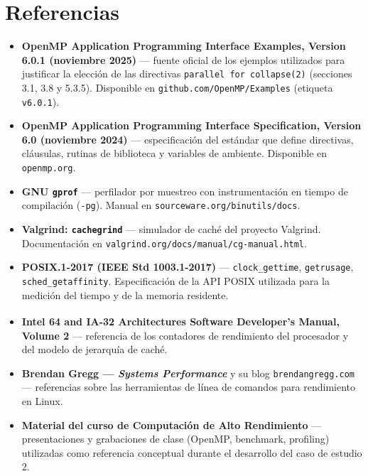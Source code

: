 \section{Referencias}

\begin{itemize}
    \item \textbf{OpenMP Application Programming Interface Examples, Version 6.0.1 (noviembre 2025)} --- fuente oficial de los ejemplos utilizados para justificar la elección de las directivas \texttt{parallel for collapse(2)} (secciones 3.1, 3.8 y 5.3.5). Disponible en \texttt{github.com/OpenMP/Examples} (etiqueta \texttt{v6.0.1}).

    \item \textbf{OpenMP Application Programming Interface Specification, Version 6.0 (noviembre 2024)} --- especificación del estándar que define directivas, cláusulas, rutinas de biblioteca y variables de ambiente. Disponible en \texttt{openmp.org}.

    \item \textbf{GNU \texttt{gprof}} --- perfilador por muestreo con instrumentación en tiempo de compilación (\texttt{-pg}). Manual en \texttt{sourceware.org/binutils/docs}.

    \item \textbf{Valgrind: \texttt{cachegrind}} --- simulador de caché del proyecto Valgrind. Documentación en \texttt{valgrind.org/docs/manual/cg-manual.html}.

    \item \textbf{POSIX.1-2017 (IEEE Std 1003.1-2017)} --- \texttt{clock\_gettime}, \texttt{getrusage}, \texttt{sched\_getaffinity}. Especificación de la API POSIX utilizada para la medición del tiempo y de la memoria residente.

    \item \textbf{Intel\textsuperscript{\textregistered} 64 and IA-32 Architectures Software Developer's Manual, Volume 2} --- referencia de los contadores de rendimiento del procesador y del modelo de jerarquía de caché.

    \item \textbf{Brendan Gregg --- \textit{Systems Performance}} y su blog \texttt{brendangregg.com} --- referencias sobre las herramientas de línea de comandos para rendimiento en Linux.

    \item \textbf{Material del curso de Computación de Alto Rendimiento} --- presentaciones y grabaciones de clase (OpenMP, benchmark, profiling) utilizadas como referencia conceptual durante el desarrollo del caso de estudio 2.
\end{itemize}
